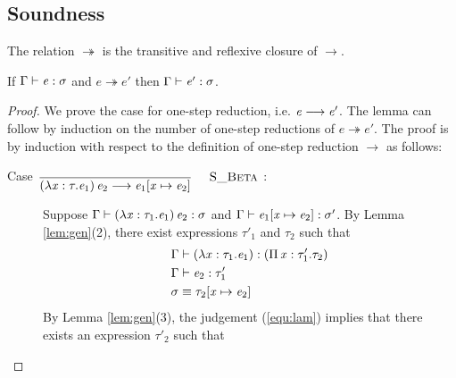 \subsection{Soundness}
\begin{dfn}
    The relation $ \twoheadrightarrow $ is the transitive and reflexive closure of $ \longrightarrow $.
\end{dfn}

\begin{lem}
If $\Gamma  \vdash  \mathit{e}  :  \sigma$ and $e  \twoheadrightarrow  e'$ then $\Gamma  \vdash  \mathit{e'}  :  \sigma$.
\end{lem}

\begin{proof}
    We prove the case for one-step reduction, i.e. $\mathit{e}  \longrightarrow  \mathit{e'}$. The lemma can follow by induction on the number of one-step reductions of $e  \twoheadrightarrow  e'$.
    The proof is by induction with respect to the definition of one-step reduction $ \longrightarrow $ as follows:
    \begin{description}
        \item[Case ${\displaystyle\frac{\begin{array}{l} \end{array}}{ ( \lambda \mathit{x} : \tau . \mathit{e_{{\mathrm{1}}}} ) \, \mathit{e_{{\mathrm{2}}}} \longrightarrow \mathit{e_{{\mathrm{1}}}} [ \mathit{x} \mapsto \mathit{e_{{\mathrm{2}}}} ]}\quad\textsc{ {\textsc{S\_Beta}}{} }}$:] $\quad$ \\
        Suppose $\Gamma  \vdash  (  \lambda  \mathit{x}  :  \tau_{{\mathrm{1}}}  .  \mathit{e_{{\mathrm{1}}}}  ) \, \mathit{e_{{\mathrm{2}}}}  :  \sigma$ and $\Gamma  \vdash  \mathit{e_{{\mathrm{1}}}}  [  \mathit{x}  \mapsto  \mathit{e_{{\mathrm{2}}}}  ]  :  \sigma'$. By Lemma \ref{lem:gen}(2), there exist expressions $\tau'_{{\mathrm{1}}}$ and $\tau_{{\mathrm{2}}}$ such that 
        \begin{align}
            &\Gamma  \vdash  (  \lambda  \mathit{x}  :  \tau_{{\mathrm{1}}}  .  \mathit{e_{{\mathrm{1}}}}  )  :  (  \Pi \, \mathit{x}  :  \tau'_{{\mathrm{1}}}  .  \tau_{{\mathrm{2}}}  ) \label{equ:lam} \\
            &\Gamma  \vdash  \mathit{e_{{\mathrm{2}}}}  :  \tau'_{{\mathrm{1}}} \nonumber \\
            &\sigma  \equiv  \tau_{{\mathrm{2}}}  [  \mathit{x}  \mapsto  \mathit{e_{{\mathrm{2}}}}  ] \nonumber
        \end{align}
        By Lemma \ref{lem:gen}(3), the judgement (\ref{equ:lam}) implies that there exists an expression $\tau'_{{\mathrm{2}}}$ such that

\end{description}
\end{proof}
